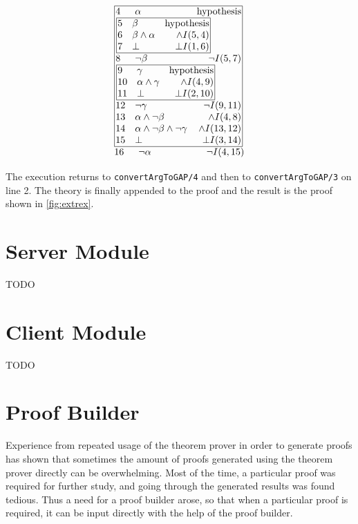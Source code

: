 \documentclass[11pt,twoside,a4paper]{report}
\begin{document}
\[\vbox{\offinterlineskip\halign{
&\tabskip=1.5em#\strut&$#$\hfil\tabskip=1em&\hfil$#$\tabskip=0em\cr
%
\multispan3\vbox{\halign{
\vrule#&&\hskip.1em\tabskip=1em#\strut&$#$\hfil\tabskip=1em&\hfil$#$\hskip0.1em\tabskip=0em&\vrule#\cr
\noalign{\hrule}
%
&4&\alpha&\mbox{hypothesis}&\cr
%
&\multispan3\,\vbox{\halign{
\vrule#&&\hskip.1em\tabskip=1em#\strut&$#$\hfil\tabskip=1em&\hfil$#$\hskip0.1em\tabskip=0em&\vrule#\cr
\noalign{\hrule}
%
&5&\beta&\mbox{hypothesis}&\cr
&6&\beta\wedge\alpha&\wedge I(5,4)&\cr
&7&\bot&\bot I(1,6)&\cr
%
\noalign{\hrule}}}\,&\cr
%
&8&\neg\beta&\neg I(5,7)&\cr
%
&\multispan3\,\vbox{\halign{
\vrule#&&\hskip.1em\tabskip=1em#\strut&$#$\hfil\tabskip=1em&\hfil$#$\hskip0.1em\tabskip=0em&\vrule#\cr
\noalign{\hrule}
%
&9&\gamma&\mbox{hypothesis}&\cr
&10&\alpha\wedge\gamma&\wedge I(4,9)&\cr
&11&\bot&\bot I(2,10)&\cr
%
\noalign{\hrule}}}\,&\cr
%
&12&\neg\gamma&\neg I(9,11)&\cr
&13&\alpha\wedge\neg\beta&\wedge I(4,8)&\cr
&14&\alpha\wedge\neg\beta\wedge\neg\gamma&\wedge I(13,12)&\cr
&15&\bot&\bot I(3,14)&\cr
%
\noalign{\hrule}}}\,\cr
%
16&\neg\alpha&\neg I(4,15)\cr
}}\]

The execution returns to \lstinline$convertArgToGAP/4$ and then to \lstinline$convertArgToGAP/3$ on line 2. The theory is finally appended to the proof and the result is the proof shown in \autoref{fig:extrex}.

\chapter{Server Module}
\label{chap:server}
TODO

\chapter{Client Module}
\label{chap:client}
TODO

\chapter{Proof Builder}
\label{chap:proofbuilder}
Experience from repeated usage of the theorem prover in order to generate proofs has shown that sometimes the amount of proofs generated using the theorem prover directly can be overwhelming. Most of the time, a particular proof was required for further study, and going through the generated results was found tedious. Thus a need for a proof builder arose, so that when a particular proof is required, it can be input directly with the help of the proof builder.
\end{document}
